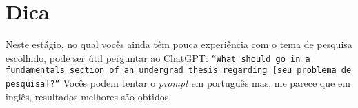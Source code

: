 \documentclass[12pt,a4paper, brazil]{article}
\begin{document}
\section{Dica}

Neste estágio, no qual vocês ainda têm pouca experiência com o tema de pesquisa escolhido, pode ser útil perguntar ao ChatGPT: \texttt{``What should go in a fundamentals section of an undergrad thesis regarding [seu problema de pesquisa]?''} Vocês podem tentar o \textit{prompt} em português mas, me parece que em inglês, resultados melhores são obtidos.

\printbibliography
\end{document}
